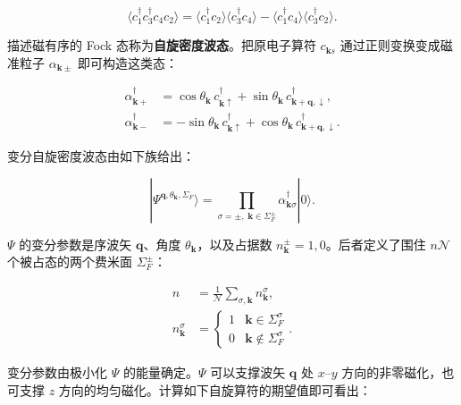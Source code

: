 \begin{equation*}
\langle c _ {1} ^ {\dagger} c _ {3} ^ {\dagger} c _ {4} c _ {2} \rangle = \langle c _ {1} ^ {\dagger} c _ {2} \rangle \langle c _ {3} ^ {\dagger} c _ {4} \rangle - \langle c _ {1} ^ {\dagger} c _ {4} \rangle \langle c _ {3} ^ {\dagger} c _ {2} \rangle .
\tag{4.4}
\end{equation*}

描述磁有序的 Fock 态称为\textbf{自旋密度波态}。把原电子算符 $c_{\mathbf{k}s}$ 通过正则变换变成磁准粒子 $\alpha_{\mathbf{k}\pm}$ 即可构造这类态：

\begin{align*}
\alpha_ {\mathbf {k} +} ^ {\dagger} & = \cos \theta_ {\mathbf {k}} \, c _ {\mathbf {k} \uparrow} ^ {\dagger} + \sin \theta_ {\mathbf {k}} \, c _ {\mathbf {k} + \mathbf {q}, \downarrow} ^ {\dagger},\\
\alpha_ {\mathbf {k} -} ^ {\dagger} & = - \sin \theta_ {\mathbf {k}} \, c _ {\mathbf {k} \uparrow} ^ {\dagger} + \cos \theta_ {\mathbf {k}} \, c _ {\mathbf {k} + \mathbf {q}, \downarrow} ^ {\dagger}.
\tag{4.5}
\end{align*}

变分自旋密度波态由如下族给出：

\begin{equation*}
| \Psi^ {\mathbf {q}, \theta_ {\mathbf {k}}, \Sigma_ {F}} \rangle = \prod_ {\sigma = \pm ,\; \mathbf {k} \in \Sigma_ {F} ^ {\pm}} \alpha_ {\mathbf {k} \sigma} ^ {\dagger} | 0 \rangle .
\tag{4.6}
\end{equation*}

$\Psi$ 的变分参数是序波矢 $\mathbf{q}$、角度 $\theta_{\mathbf{k}}$，以及占据数 $n_{\mathbf{k}}^{\pm}=1,0$。后者定义了围住 $n\mathcal{N}$ 个被占态的两个费米面 $\Sigma_{F}^{\pm}$：

\begin{align*}
n & = \frac {1}{\mathcal {N}} \sum_ {\sigma , \mathbf {k}} n _ {\mathbf {k}} ^ {\sigma},\\
n _ {\mathbf {k}} ^ {\sigma} & = \left\{ \begin{array}{ll} 1 & \mathbf {k} \in \Sigma_ {F} ^ {\sigma} \\ 0 & \mathbf {k} \notin \Sigma_ {F} ^ {\sigma} \end{array} \right. .
\tag{4.7}
\end{align*}

变分参数由极小化 $\Psi$ 的能量确定。$\Psi$ 可以支撑波矢 $\mathbf{q}$ 处 $x$--$y$ 方向的非零磁化，也可支撑 $z$ 方向的均匀磁化。计算如下自旋算符的期望值即可看出：

